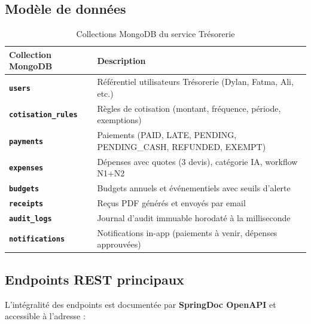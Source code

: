 \documentclass[11pt,a4paper]{article}
\begin{document}
\subsection{Modèle de données}

\begin{table}[h]
  \centering
  \small
  \begin{tabularx}{\linewidth}{>{\bfseries}lX}
    \toprule
    Collection MongoDB & Description \\
    \midrule
    \texttt{users}              & Référentiel utilisateurs Trésorerie (Dylan, Fatma, Ali, etc.) \\
    \texttt{cotisation\_rules}  & Règles de cotisation (montant, fréquence, période, exemptions) \\
    \texttt{payments}           & Paiements (PAID, LATE, PENDING, PENDING\_CASH, REFUNDED, EXEMPT) \\
    \texttt{expenses}           & Dépenses avec quotes (3 devis), catégorie IA, workflow N1+N2 \\
    \texttt{budgets}            & Budgets annuels et événementiels avec seuils d'alerte \\
    \texttt{receipts}           & Reçus PDF générés et envoyés par email \\
    \texttt{audit\_logs}        & Journal d'audit immuable horodaté à la milliseconde \\
    \texttt{notifications}      & Notifications in-app (paiements à venir, dépenses approuvées) \\
    \bottomrule
  \end{tabularx}
  \caption{Collections MongoDB du service Trésorerie}
\end{table}

\subsection{Endpoints REST principaux}

L'intégralité des endpoints est documentée par \textbf{SpringDoc OpenAPI} et accessible à l'adresse :
\begin{center}
\end{center}
\end{document}
